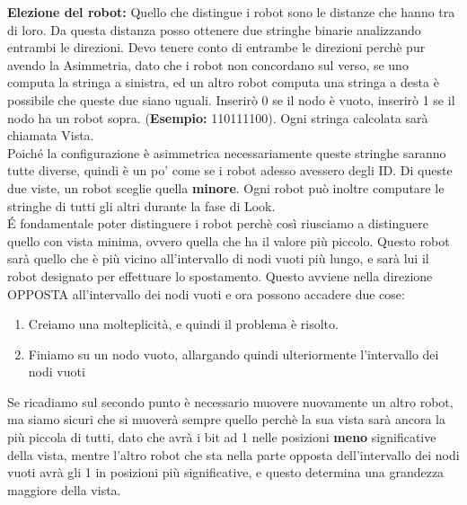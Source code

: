 \textbf{Elezione del robot:} Quello che distingue i robot sono le distanze che hanno tra di loro. Da questa distanza posso ottenere due stringhe binarie analizzando entrambi le direzioni. Devo tenere conto di entrambe le direzioni perchè pur avendo la Asimmetria, dato che i robot non concordano sul verso, se uno computa la stringa a sinistra, ed un altro robot computa una stringa a desta è possibile che queste due siano uguali. Inserirò 0 se il nodo è vuoto, inserirò 1 se il nodo ha un robot sopra. (\textbf{Esempio:} 110111100). Ogni stringa calcolata sarà chiamata Vista. \\ Poiché la configurazione è asimmetrica necessariamente queste stringhe saranno tutte diverse, quindi è un po' come se i robot adesso avessero degli ID. Di queste due viste, un robot sceglie quella \textbf{minore}. Ogni robot può inoltre computare le stringhe di tutti gli altri durante la fase di Look.\\ \'E fondamentale poter distinguere i robot perchè così riusciamo a distinguere quello con vista minima, ovvero quella che ha il valore più piccolo. Questo robot sarà quello che è più vicino all'intervallo di nodi vuoti più lungo, e sarà lui il robot designato per effettuare lo spostamento. Questo avviene nella direzione OPPOSTA all'intervallo dei nodi vuoti e ora possono accadere due cose:
\begin{enumerate}
    \item Creiamo una molteplicità, e quindi il problema è risolto.
    \item Finiamo su un nodo vuoto, allargando quindi ulteriormente l'intervallo dei nodi vuoti
\end{enumerate}
Se ricadiamo sul secondo punto è necessario muovere nuovamente un altro robot, ma siamo sicuri che si muoverà sempre quello perchè la sua vista sarà ancora la più piccola di tutti, dato che avrà i bit ad 1 nelle posizioni \textbf{meno} significative della vista, mentre l'altro robot che sta nella parte opposta dell'intervallo dei nodi vuoti avrà gli 1 in posizioni più significative, e questo determina una grandezza maggiore della vista.




